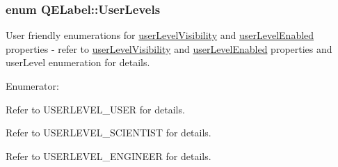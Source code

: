 \hypertarget{classQELabel_ada938d547e11d1ca32786d8bb913ca8a}{
\subsubsection[{UserLevels}]{\setlength{\rightskip}{0pt plus 5cm}enum {\bf QELabel::UserLevels}}}
\label{classQELabel_ada938d547e11d1ca32786d8bb913ca8a}
User friendly enumerations for \hyperlink{classQELabel_a8e553fceee2d1bcb5b2e6fbacbc100d6}{userLevelVisibility} and \hyperlink{classQELabel_aecfbc76bbf4cfdf829d5f3c25395a61c}{userLevelEnabled} properties -\/ refer to \hyperlink{classQELabel_a8e553fceee2d1bcb5b2e6fbacbc100d6}{userLevelVisibility} and \hyperlink{classQELabel_aecfbc76bbf4cfdf829d5f3c25395a61c}{userLevelEnabled} properties and userLevel enumeration for details. \begin{Desc}
\item[Enumerator: ]\par
\begin{description}
\item[{\em 
\hypertarget{classQELabel_ada938d547e11d1ca32786d8bb913ca8aac5f9027113d6e38a1dbc7e753f96ae8a}{
User}
\label{classQELabel_ada938d547e11d1ca32786d8bb913ca8aac5f9027113d6e38a1dbc7e753f96ae8a}
}]Refer to USERLEVEL\_\-USER for details. \item[{\em 
\hypertarget{classQELabel_ada938d547e11d1ca32786d8bb913ca8aaee758ecac87a743fc83bbb6cedd7f94e}{
Scientist}
\label{classQELabel_ada938d547e11d1ca32786d8bb913ca8aaee758ecac87a743fc83bbb6cedd7f94e}
}]Refer to USERLEVEL\_\-SCIENTIST for details. \item[{\em 
\hypertarget{classQELabel_ada938d547e11d1ca32786d8bb913ca8aa563d52586b8f110854e9e60353c60d8f}{
Engineer}
\label{classQELabel_ada938d547e11d1ca32786d8bb913ca8aa563d52586b8f110854e9e60353c60d8f}
}]Refer to USERLEVEL\_\-ENGINEER for details. \end{description}
\end{Desc}



